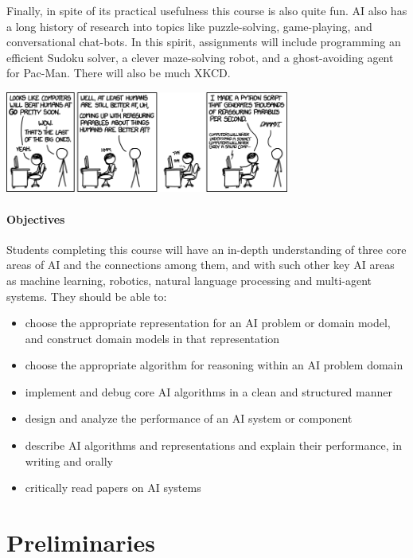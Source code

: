 \documentclass[11pt]{article}
\begin{document}
Finally, in spite of its practical usefulness this course is also
quite fun. AI also has a long history of research into topics like
puzzle-solving, game-playing, and conversational chat-bots. In this
spirit, assignments will include programming an efficient Sudoku
solver, a clever maze-solving robot, and a ghost-avoiding agent for
Pac-Man. There will also be much XKCD.


\begin{center}
  \includegraphics[width=0.7\textwidth]{reassuring}
\end{center}

\paragraph{Objectives}

Students completing this course will have an in-depth understanding of
three core areas of AI and the connections among them, and with such
other key AI areas as machine learning, robotics, natural language
processing and multi-agent systems. They should be able to:

\begin{itemize}
\item choose the appropriate representation for an AI problem or
  domain model, and construct domain models in that representation
\item choose the appropriate algorithm for reasoning within an AI
  problem domain
\item implement and debug core AI algorithms in a clean and structured
  manner
\item design and analyze the performance of an AI system
  or component
\item describe AI algorithms and representations and explain their
  performance, in writing and orally
\item critically read papers on AI systems
\end{itemize} 

\section{Preliminaries} 
\end{document}

